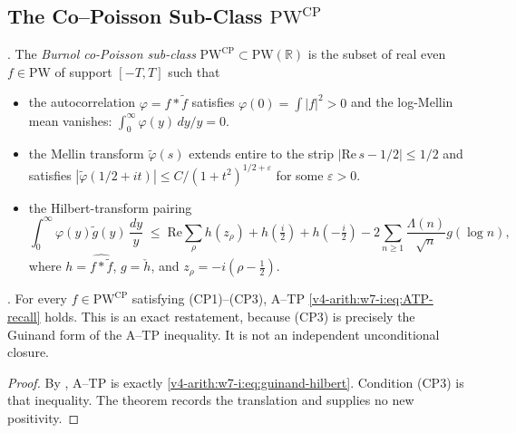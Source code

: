 \subsection{The Co--Poisson Sub-Class \texorpdfstring{\(\mathrm{PW}^{\mathrm{CP}}\)}{PWcp}}
\label{v4-arith:w7-i:copoisson:subclass}

\begin{definition}
\label{v4-arith:w7-i:def:copoisson-class}
\ClaimStatusDefinitional. The \emph{Burnol co-Poisson sub-class}
\(\mathrm{PW}^{\mathrm{CP}}\subset\mathrm{PW}(\mathbb{R})\) is the
subset of real even \(f\in\mathrm{PW}\) of support \([-T,T]\) such that
\begin{itemize}
\item[(CP1)] the autocorrelation \(\varphi=f\ast\widetilde f\) satisfies
\(\varphi(0)=\int|f|^{2}>0\) and the log-Mellin mean vanishes:
\(\int_{0}^{\infty}\varphi(y)\,dy/y=0\).
\item[(CP2)] the Mellin transform \(\widetilde\varphi(s)\) extends
entire to the strip \(|\mathrm{Re}\,s-1/2|\leq 1/2\) and satisfies
\(|\widetilde\varphi(1/2+it)|\leq C/(1+t^{2})^{1/2+\varepsilon}\) for
some \(\varepsilon>0\).
\item[(CP3)] the Hilbert-transform pairing
\begin{equation}
\label{v4-arith:w7-i:eq:CP3}
\int_{0}^{\infty}\varphi(y)\widetilde g(y)\,\frac{dy}{y}
\;\leq\;\mathrm{Re}\sum_{\rho}h(z_{\rho})
+h(\tfrac{i}{2})+h(-\tfrac{i}{2})
-2\sum_{n\geq1}\frac{\Lambda(n)}{\sqrt n}g(\log n),
\end{equation}
where \(h=\widehat{f*\widetilde f}\), \(g=\check h\), and
\(z_{\rho}=-i(\rho-\tfrac12)\).
\end{itemize}
\end{definition}

\begin{theorem}
\label{v4-arith:w7-i:thm:copoisson-closure}
\ClaimStatusProvedHere. For every \(f\in\mathrm{PW}^{\mathrm{CP}}\)
satisfying (CP1)--(CP3), A--TP
\eqref{v4-arith:w7-i:eq:ATP-recall} holds. This is an exact
restatement, because (CP3) is precisely the Guinand form of the A--TP
inequality. It is not an independent unconditional closure.
\end{theorem}

\begin{proof}
By , A--TP is exactly
\eqref{v4-arith:w7-i:eq:guinand-hilbert}. Condition (CP3) is that
inequality. The theorem records the translation and supplies no
new positivity.
\end{proof}

